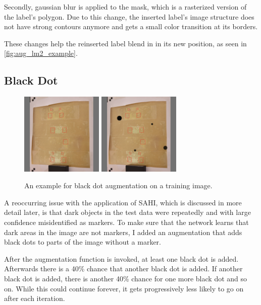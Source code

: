 \documentclass[10pt]{book}
\newcommand{\figureref}[1]{\autoref{#1}}
\begin{document}
Secondly, gaussian blur is applied to the mask, which is a rasterized version of the label's polygon. Due to this change, the inserted label's image structure does not have strong contours anymore and gets a small color transition at its borders.

These changes help the reinserted label blend in in its new position, as seen in \figureref{fig:aug_lm2_example}.

\subsection{Black Dot}

\begin{figure}
  \centering
     {\includegraphics[width=0.35\textwidth]{image/aug_bd_before}}
     {\includegraphics[width=0.35\textwidth]{image/aug_bd_after}}
  \caption{An example for black dot augmentation on a training image.}
  \label{fig:aug_bd_example}
\end{figure}

A reoccurring issue with the application of \ac{SAHI}, which is discussed in more detail later, is that dark objects in the test data were repeatedly and with large confidence misidentified as markers. To make sure that the network learns that dark areas in the image are not markers, I added an augmentation that adds black dots to parts of the image without a marker. 

After the augmentation function is invoked, at least one black dot is added. Afterwards there is a 40\% chance that another black dot is added. If another black dot is added, there is another 40\% chance for one more black dot and so on. While this could continue forever, it gets progressively less likely to go on after each iteration. 
\end{document}
